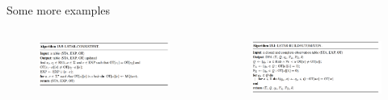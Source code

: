 \documentclass[aspectratio=169,xcolor=dvipsnames]{beamer}
\begin{document}
\begin{frame}{Some more examples}
{\begin{columns}
    \begin{figure}
        \centering
        \includegraphics[width=\linewidth]{images/alg13_5.png}
    \end{figure}

    \begin{figure}
        \centering
        \includegraphics[width=\linewidth]{images/alg13_1.png}
    \end{figure}
\end{columns}
}
\end{frame}





%     
%     
\end{document}
